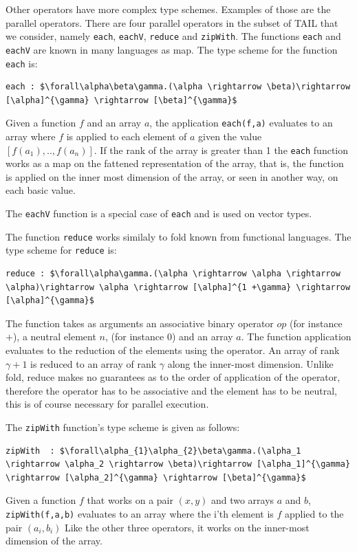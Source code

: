 \documentclass[11pt]{article}
\begin{document}
Other operators have more complex type schemes. Examples of those are the parallel operators. 
There are four parallel operators in the subset of TAIL that we consider, namely {\tt each}, {\tt eachV}, {\tt reduce} and {\tt zipWith}.
The functions {\tt each} and {\tt eachV} are known in many languages as map.
The type scheme for the function {\tt each} is:
\begin{lstlisting}[numbers=none,frame=none]
each : $\forall\alpha\beta\gamma.(\alpha \rightarrow \beta)\rightarrow [\alpha]^{\gamma} \rightarrow [\beta]^{\gamma}$
\end{lstlisting}
Given a function $f$ and an array $a$, the application {\tt each(f,a)} evaluates to an array where $f$ is applied to each element of $a$ given the value $[f(a_1),..,f(a_n)]$.
If the rank of the array is greater than 1 the {\tt each} function works as a map on the fattened representation of the array,
that is, the function is applied on the inner most dimension of the array, or seen in another way, on each basic value.

The {\tt eachV} function is a special case of {\tt each} and is used on vector types.

The function {\tt reduce} works similaly to fold known from functional languages. The type scheme for {\tt reduce} is:
\begin{lstlisting}[numbers=none,frame=none]
reduce : $\forall\alpha\gamma.(\alpha \rightarrow \alpha \rightarrow \alpha)\rightarrow \alpha \rightarrow [\alpha]^{1 +\gamma} \rightarrow [\alpha]^{\gamma}$
\end{lstlisting}
The function takes as arguments an associative binary operator $op$ (for instance $+$), a neutral element $n$, (for instance 0) and an array $a$.
The function application evaluates to the reduction of the elements using the operator.
An array of rank $\gamma+1$ is reduced to an array of rank $\gamma$ along the inner-most dimension.
Unlike fold, reduce makes no guarantees as to the order of application of the operator, therefore the operator has to be associative and the element has to be neutral, this is of course necessary for parallel execution.

The {\tt zipWith} function's type scheme is given as follows: 
\begin{lstlisting}[numbers=none,frame=none]
zipWith  : $\forall\alpha_{1}\alpha_{2}\beta\gamma.(\alpha_1 \rightarrow \alpha_2 \rightarrow \beta)\rightarrow [\alpha_1]^{\gamma} \rightarrow [\alpha_2]^{\gamma} \rightarrow [\beta]^{\gamma}$
\end{lstlisting}
Given a function $f$ that works on a pair $(x,y)$ and two arrays $a$ and $b$, {\tt zipWith(f,a,b)}  evaluates to an array where the i'th element is $f$ applied to the pair $(a_i,b_i)$ 
Like the other three operators, it works on the inner-most dimension of the array\cite{ElsmanDybdal:Array:2014}.
\end{document}
